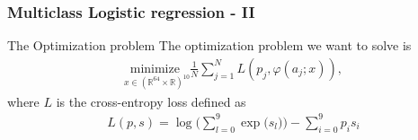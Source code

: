 \documentclass[12pt]{beamer}
\begin{document}
     \begin{frame}
        \frametitle{Multiclass Logistic regression - II}
        \begin{block}{The Optimization problem}
        The optimization problem we want to solve is
        \begin{align*} 
            \underset{x\in(\mathbb{R}^{64}\times \mathbb{R})^{10}}{\text{minimize }} \frac{1}{N}\sum_{j=1}^N L(p_j,\varphi(a_j;x)),
        \end{align*}
        where $L$ is the cross-entropy loss defined as
        \begin{align*}
            L(p,s) = \log\!\Big(\sum_{l=0}^{9} \exp\big(s_l\big)\Big) - \sum_{i=0}^{9} p_i s_i
        \end{align*}
        \end{block}
    \end{frame}
\end{document}

